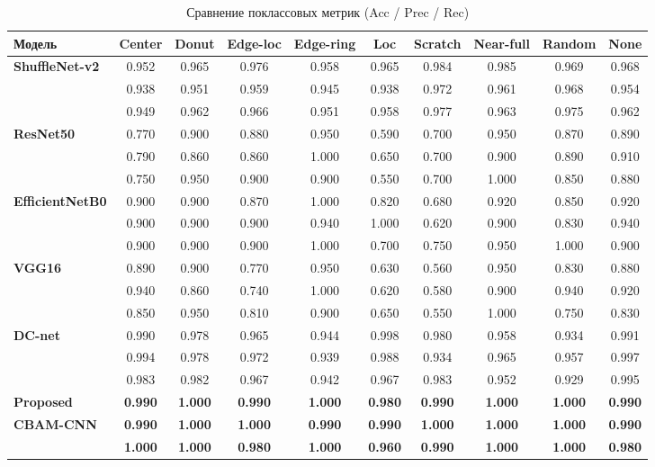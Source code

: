 \documentclass[11pt,a4paper]{article}
\begin{document}
\begin{table}[h!]
\centering
\caption{Сравнение поклассовых метрик (Acc / Prec / Rec)}
\label{tab:comparison_baseline}
\small
\begin{tabular}{lccccccccc}
\toprule
\textbf{Модель} & \textbf{Center} & \textbf{Donut} & \textbf{Edge-loc} & \textbf{Edge-ring} & \textbf{Loc} & \textbf{Scratch} & \textbf{Near-full} & \textbf{Random} & \textbf{None} \\
\midrule
\textbf{ShuffleNet-v2} & 0.952 & 0.965 & 0.976 & 0.958 & 0.965 & 0.984 & 0.985 & 0.969 & 0.968 \\
& 0.938 & 0.951 & 0.959 & 0.945 & 0.938 & 0.972 & 0.961 & 0.968 & 0.954 \\
& 0.949 & 0.962 & 0.966 & 0.951 & 0.958 & 0.977 & 0.963 & 0.975 & 0.962 \\
\midrule
\textbf{ResNet50} & 0.770 & 0.900 & 0.880 & 0.950 & 0.590 & 0.700 & 0.950 & 0.870 & 0.890 \\
& 0.790 & 0.860 & 0.860 & 1.000 & 0.650 & 0.700 & 0.900 & 0.890 & 0.910 \\
& 0.750 & 0.950 & 0.900 & 0.900 & 0.550 & 0.700 & 1.000 & 0.850 & 0.880 \\
\midrule
\textbf{EfficientNetB0} & 0.900 & 0.900 & 0.870 & 1.000 & 0.820 & 0.680 & 0.920 & 0.850 & 0.920 \\
& 0.900 & 0.900 & 0.900 & 0.940 & 1.000 & 0.620 & 0.900 & 0.830 & 0.940 \\
& 0.900 & 0.900 & 0.900 & 1.000 & 0.700 & 0.750 & 0.950 & 1.000 & 0.900 \\
\midrule
\textbf{VGG16} & 0.890 & 0.900 & 0.770 & 0.950 & 0.630 & 0.560 & 0.950 & 0.830 & 0.880 \\
& 0.940 & 0.860 & 0.740 & 1.000 & 0.620 & 0.580 & 0.900 & 0.940 & 0.920 \\
& 0.850 & 0.950 & 0.810 & 0.900 & 0.650 & 0.550 & 1.000 & 0.750 & 0.830 \\
\midrule
\textbf{DC-net} & 0.990 & 0.978 & 0.965 & 0.944 & 0.998 & 0.980 & 0.958 & 0.934 & 0.991 \\
& 0.994 & 0.978 & 0.972 & 0.939 & 0.988 & 0.934 & 0.965 & 0.957 & 0.997 \\
& 0.983 & 0.982 & 0.967 & 0.942 & 0.967 & 0.983 & 0.952 & 0.929 & 0.995 \\
\midrule
\textbf{Proposed} & \textbf{0.990} & \textbf{1.000} & \textbf{0.990} & \textbf{1.000} & \textbf{0.980} & \textbf{0.990} & \textbf{1.000} & \textbf{1.000} & \textbf{0.990} \\
\textbf{CBAM-CNN} & \textbf{0.990} & \textbf{1.000} & \textbf{1.000} & \textbf{0.990} & \textbf{0.990} & \textbf{1.000} & \textbf{1.000} & \textbf{1.000} & \textbf{0.990} \\
& \textbf{1.000} & \textbf{1.000} & \textbf{0.980} & \textbf{1.000} & \textbf{0.960} & \textbf{0.990} & \textbf{1.000} & \textbf{1.000} & \textbf{0.980} \\
\bottomrule
\end{tabular}
\end{table}
\end{document}
